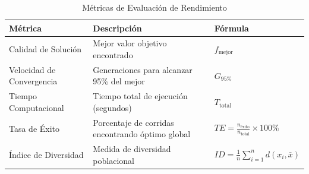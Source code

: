 \documentclass[10pt,a4paper]{article}
\begin{document}
\begin{table}[H]
\centering
\caption{Métricas de Evaluación de Rendimiento}
\begin{tabular}{@{}lll@{}}
\toprule
\textbf{Métrica} & \textbf{Descripción} & \textbf{Fórmula} \\
\midrule
Calidad de Solución & Mejor valor objetivo encontrado & $f_{\text{mejor}}$ \\
Velocidad de Convergencia & Generaciones para alcanzar 95\% del mejor & $G_{95\%}$ \\
Tiempo Computacional & Tiempo total de ejecución (segundos) & $T_{\text{total}}$ \\
Tasa de Éxito & Porcentaje de corridas encontrando óptimo global & $TE = \frac{n_{\text{éxito}}}{n_{\text{total}}} \times 100\%$ \\
Índice de Diversidad & Medida de diversidad poblacional & $ID = \frac{1}{n}\sum_{i=1}^{n}d(x_i, \bar{x})$ \\
\bottomrule
\end{tabular}
\label{tab:metrics}
\end{table}
\end{document}
